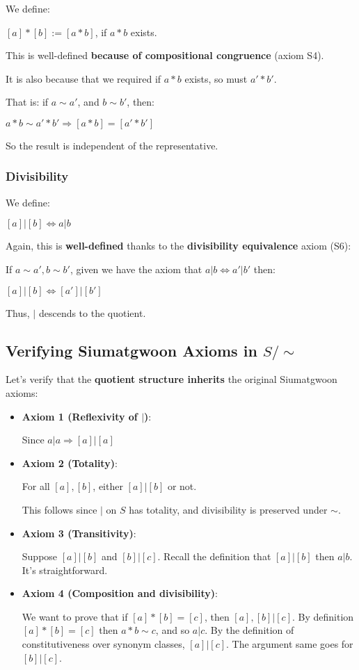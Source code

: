 We define:

$[a]*[b]:=[a*b]$, if $a*b$ exists.

This is well-defined \textbf{because of compositional congruence} (axiom S4).

It is also because that we required if $a*b$ exists, so must $a'*b'$.

That is: if $a \sim a'$, and $b \sim b'$, then:

$a*b\sim a'*b'\Rightarrow [a*b]=[a'*b']$

So the result is independent of the representative.

\subsubsection{Divisibility}

We define:

$[a]|[b] \iff a|b$

Again, this is \textbf{well-defined} thanks to the \textbf{divisibility equivalence} axiom (S6):

If $a\sim a', b \sim b'$, given we have the axiom that $a|b \iff a'|b'$ then:

$[a]|[b] \iff [a']|[b']$

Thus, $|$ descends to the quotient.

\subsection{Verifying Siumatgwoon Axioms in $S/\sim$}

Let's verify that the \textbf{quotient structure inherits} the original Siumatgwoon axioms:

\begin{itemize}
\item \textbf{Axiom 1 (Reflexivity of $|$)}:
    
    Since $a|a\Rightarrow[a]|[a]$
    
\item \textbf{Axiom 2 (Totality)}:
    
    For all $[a],[b]$, either $[a]|[b]$ or not.
    
    This follows since $|$ on $S$ has totality, and divisibility is preserved under $\sim$.
    
\item \textbf{Axiom 3 (Transitivity)}:
    
    Suppose $[a]|[b]$ and $[b]|[c]$. Recall the definition that $[a]|[b]$ then $a|b$. It's straightforward.
    
\item \textbf{Axiom 4 (Composition and divisibility)}:
    
    We want to prove that if $[a]*[b]=[c]$, then $[a],[b] | [c]$. By definition $[a]*[b]=[c]$ then $a*b\sim c$, and so $a|c$. By the definition of constitutiveness over synonym classes, $[a]|[c]$. The argument same goes for $[b]|[c]$.
\end{itemize}


